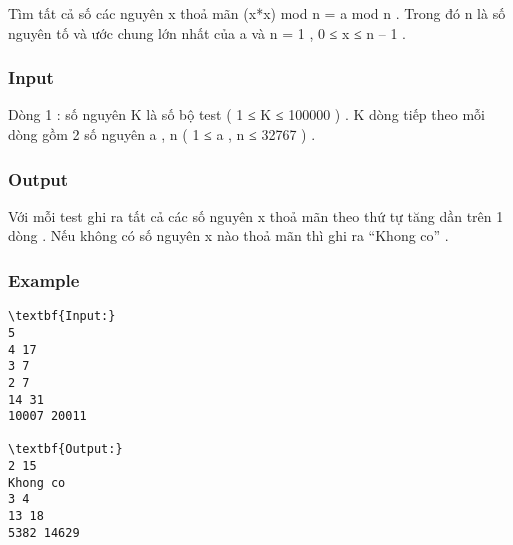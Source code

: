 



   Tìm tất cả số các nguyên x thoả mãn (x*x) mod n = a mod n . Trong đó n là số nguyên tố và ước chung lớn nhất của a và n = 1 , 0 ≤ x ≤ n – 1 .  

\subsubsection{   Input  }

   Dòng 1 : số nguyên K là số bộ test ( 1 ≤ K ≤ 100000 ) . K dòng tiếp theo mỗi dòng gồm 2 số nguyên a , n (  1 ≤ a , n ≤ 32767 ) .  

\subsubsection{   Output  }

   Với mỗi test ghi ra tất cả các số nguyên x thoả mãn theo thứ tự tăng dần trên 1 dòng . Nếu không có số nguyên x nào thoả mãn thì ghi ra “Khong co” .  

\subsubsection{   Example  }
\begin{verbatim}
\textbf{Input:}
5
4 17
3 7
2 7
14 31
10007 20011

\textbf{Output:}
2 15
Khong co
3 4
13 18
5382 14629
\end{verbatim}